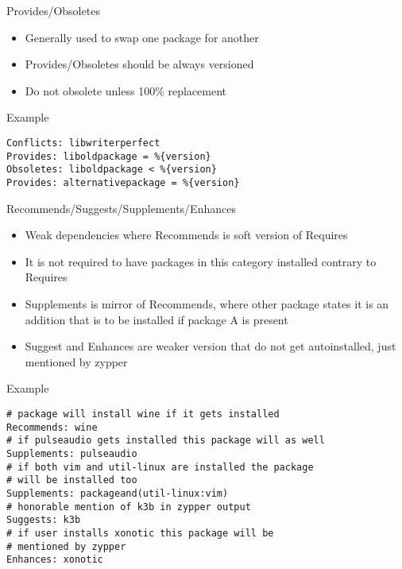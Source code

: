 \documentclass{beamer}
\begin{document}
\begin{frame}[t]{Provides/Obsoletes}
	\begin{itemize}
	\item Generally used to swap one package for another
    \item Provides/Obsoletes should be always versioned
    \item Do not obsolete unless 100\% replacement
	\end{itemize}
\end{frame}

\begin{frame}[fragile]{Example}
	\begin{small}
	\begin{verbatim}
Conflicts: libwriterperfect
Provides: liboldpackage = %{version}
Obsoletes: liboldpackage < %{version}
Provides: alternativepackage = %{version}
	\end{verbatim}
	\end{small}
\end{frame}

\begin{frame}[t]{Recommends/Suggests/Supplements/Enhances}
	\begin{itemize}
	\item Weak dependencies where Recommends is soft version of Requires
    \item It is not required to have packages in this category installed contrary to Requires
    \item Supplements is mirror of Recommends, where other package states it is an addition that is to be installed if package A is present
    \item Suggest and Enhances are weaker version that do not get autoinstalled, just mentioned by zypper
	\end{itemize}
\end{frame}

\begin{frame}[fragile]{Example}
	\begin{small}
	\begin{verbatim}
# package will install wine if it gets installed
Recommends: wine
# if pulseaudio gets installed this package will as well
Supplements: pulseaudio
# if both vim and util-linux are installed the package
# will be installed too
Supplements: packageand(util-linux:vim)
# honorable mention of k3b in zypper output
Suggests: k3b
# if user installs xonotic this package will be
# mentioned by zypper
Enhances: xonotic
	\end{verbatim}
	\end{small}
\end{frame}
\end{document}
